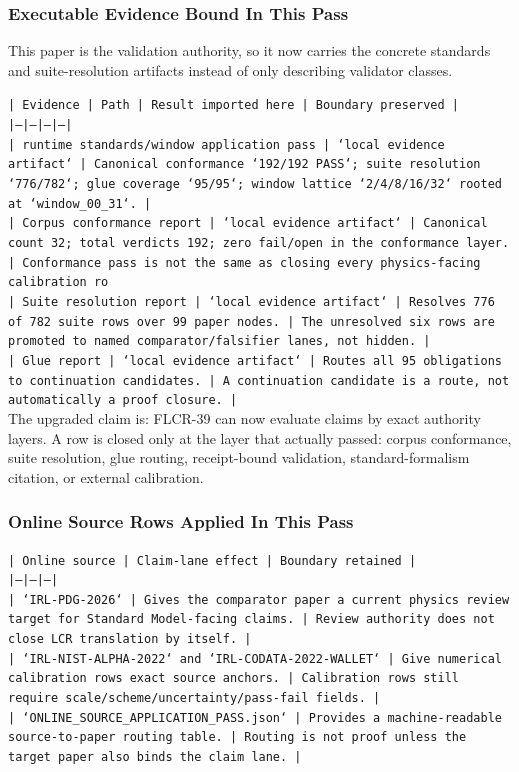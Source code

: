 \documentclass[11pt]{article}
\begin{document}
\subsubsection*{Executable Evidence Bound In This Pass}

This paper is the validation authority, so it now carries the concrete standards and suite-resolution artifacts instead of only describing validator classes.

\noindent\texttt{| Evidence | Path | Result imported here | Boundary preserved |}\\
\noindent\texttt{|---|---|---|---|}\\
\noindent\texttt{| runtime standards/window application pass | `local evidence artifact` | Canonical conformance `192/192 PASS`; suite resolution `776/782`; glue coverage `95/95`; window lattice `2/4/8/16/32` rooted at `window\_00\_31`. | }\\
\noindent\texttt{| Corpus conformance report | `local evidence artifact` | Canonical count 32; total verdicts 192; zero fail/open in the conformance layer. | Conformance pass is not the same as closing every physics-facing calibration ro}\\
\noindent\texttt{| Suite resolution report | `local evidence artifact` | Resolves 776 of 782 suite rows over 99 paper nodes. | The unresolved six rows are promoted to named comparator/falsifier lanes, not hidden. |}\\
\noindent\texttt{| Glue report | `local evidence artifact` | Routes all 95 obligations to continuation candidates. | A continuation candidate is a route, not automatically a proof closure. |}\\

The upgraded claim is: FLCR-39 can now evaluate claims by exact authority layers. A row is closed only at the layer that actually passed: corpus conformance, suite resolution, glue routing, receipt-bound validation, standard-formalism citation, or external calibration.

\subsubsection*{Online Source Rows Applied In This Pass}

\noindent\texttt{| Online source | Claim-lane effect | Boundary retained |}\\
\noindent\texttt{|---|---|---|}\\
\noindent\texttt{| `IRL-PDG-2026` | Gives the comparator paper a current physics review target for Standard Model-facing claims. | Review authority does not close LCR translation by itself. |}\\
\noindent\texttt{| `IRL-NIST-ALPHA-2022` and `IRL-CODATA-2022-WALLET` | Give numerical calibration rows exact source anchors. | Calibration rows still require scale/scheme/uncertainty/pass-fail fields. |}\\
\noindent\texttt{| `ONLINE\_SOURCE\_APPLICATION\_PASS.json` | Provides a machine-readable source-to-paper routing table. | Routing is not proof unless the target paper also binds the claim lane. |}\\
\end{document}
